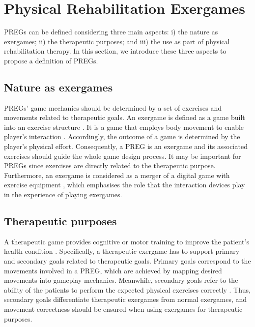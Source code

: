 \section{Physical Rehabilitation Exergames}\label{sec:def_reh_ex} %
\acp{PREG} can be defined considering three main aspects: i) the nature as exergames; ii) the therapeutic purposes; and iii) the use as part of physical rehabilitation therapy. In this section, we introduce these three aspects to propose a definition of \acp{PREG}.

\subsection{Nature as exergames}
\label{sub:def_ex}
\acp{PREG}' game mechanics should be determined by a set of exercises and movements related to therapeutic goals. An exergame is defined as a game built into an exercise structure \autocite{Pirovano2016}. It is a game that employs body movement to enable player's interaction \autocite{Mueller2011}. Accordingly, the outcome of a game is determined by the player's physical effort. Consequently, a \ac{PREG} is an exergame and its associated exercises should guide the whole game design process. It may be important for \acp{PREG} since exercises are directly related to the therapeutic purpose. Furthermore, an exergame is considered as a merger of a digital game with exercise equipment \autocite{Sinclair2009}, which emphasises the role that the interaction devices play in the experience of playing exergames.

\subsection{Therapeutic purposes}
\label{sub:def_therapeutic_g}
A therapeutic game provides cognitive or motor training to improve the patient's health condition \autocite{Mader2012}. Specifically, a therapeutic exergame has to support primary and secondary goals related to therapeutic goals. Primary goals correspond to the movements involved in a \ac{PREG}, which are achieved by mapping desired movements into gameplay mechanics. Meanwhile, secondary goals refer to the ability of the patients to perform the expected physical exercises correctly \autocite{Pirovano2016}. Thus, secondary goals differentiate therapeutic exergames from normal exergames, and movement correctness should be ensured when using exergames for therapeutic purposes.

